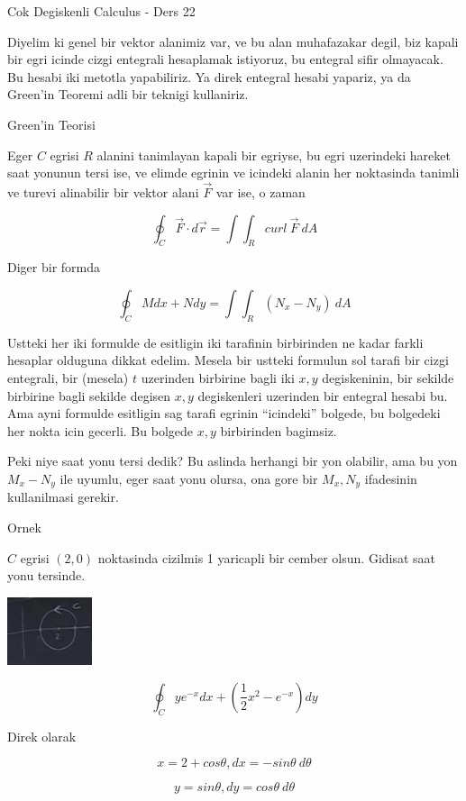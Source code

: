 \documentclass[12pt,fleqn]{article}
\begin{document}
Cok Degiskenli Calculus - Ders 22

Diyelim ki genel bir vektor alanimiz var, ve bu alan muhafazakar degil, biz
kapali bir egri icinde cizgi entegrali hesaplamak istiyoruz, bu entegral
sifir olmayacak. Bu hesabi iki metotla yapabiliriz. Ya direk entegral
hesabi yapariz, ya da Green'in Teoremi adli bir teknigi kullaniriz. 

Green'in Teorisi

Eger $C$ egrisi $R$ alanini tanimlayan kapali bir egriyse, bu egri
uzerindeki hareket saat yonunun tersi ise, ve elimde egrinin ve icindeki
alanin her noktasinda tanimli ve turevi alinabilir bir vektor alani
$\vec{F}$ var ise, o zaman 

\[ \oint_C \vec{F} \cdot d\vec{r} = \int \int_R curl \ \vec{F} \ dA \]

Diger bir formda 

\[ \oint_C M dx + N dy = \int \int_R (N_x - N_y) \ dA \]

Ustteki her iki formulde de esitligin iki tarafinin birbirinden ne kadar
farkli hesaplar olduguna dikkat edelim. Mesela bir ustteki formulun sol
tarafi bir cizgi entegrali, bir (mesela) $t$ uzerinden birbirine bagli iki
$x,y$ degiskeninin, bir sekilde birbirine bagli sekilde degisen $x,y$
degiskenleri uzerinden bir entegral hesabi bu. Ama ayni formulde esitligin
sag tarafi egrinin ``icindeki'' bolgede, bu bolgedeki her nokta icin
gecerli. Bu bolgede $x,y$ birbirinden bagimsiz. 

Peki niye saat yonu tersi dedik? Bu aslinda herhangi bir yon olabilir, ama
bu yon $M_x-N_y$ ile uyumlu, eger saat yonu olursa, ona gore bir $M_x,N_y$
ifadesinin kullanilmasi gerekir. 

Ornek

$C$ egrisi $(2,0)$ noktasinda cizilmis 1 yaricapli bir cember
olsun. Gidisat saat yonu tersinde. 

\includegraphics[height=2cm]{22_1.png}

\[ \oint_C ye^{-x} dx + (\frac{1}{2}x^2 - e^{-x})dy \]

Direk olarak

\[ x = 2 + cos\theta, dx = -sin\theta \ d\theta \]

\[ y = sin\theta, dy = cos\theta \ d\theta \]
\end{document}

